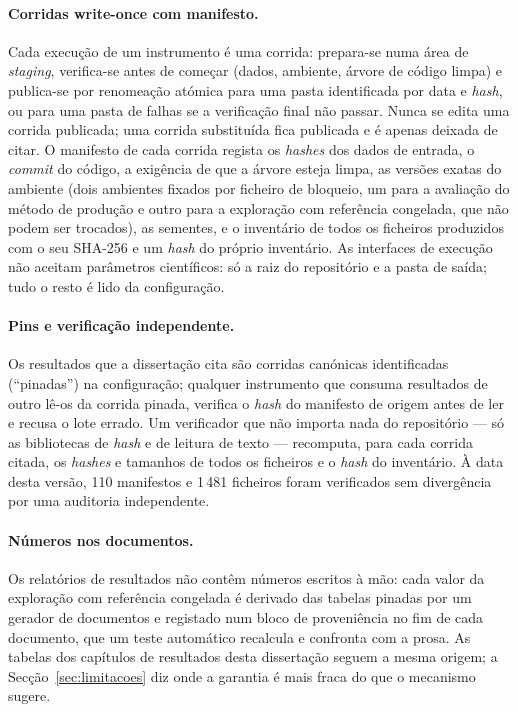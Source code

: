 \paragraph{Corridas write-once com manifesto.} Cada execução de um
instrumento é uma corrida: prepara-se numa área de \emph{staging},
verifica-se antes de começar (dados, ambiente, árvore de código limpa) e
publica-se por renomeação atómica para uma pasta identificada por data e
\emph{hash}, ou para uma pasta de falhas se a verificação final não
passar. Nunca se edita uma corrida publicada; uma corrida substituída
fica publicada e é apenas deixada de citar. O manifesto de cada corrida
regista os \emph{hashes} dos dados de entrada, o \emph{commit} do código, a
exigência de que a árvore esteja limpa, as versões exatas do ambiente
(dois ambientes fixados por ficheiro de bloqueio, um para a avaliação do
método de produção e outro para a exploração com referência congelada, que
não podem ser trocados), as sementes, e o inventário de todos os ficheiros
produzidos com o seu SHA-256 e um \emph{hash} do próprio inventário. As
interfaces de execução não aceitam parâmetros científicos: só a raiz do
repositório e a pasta de saída; tudo o resto é lido da configuração.

\paragraph{Pins e verificação independente.} Os resultados que a
dissertação cita são corridas canónicas identificadas (``pinadas'') na
configuração; qualquer instrumento que consuma resultados de outro lê-os
da corrida pinada, verifica o \emph{hash} do manifesto de origem antes de
ler e recusa o lote errado. Um verificador que não importa nada do
repositório --- só as bibliotecas de \emph{hash} e de leitura de texto ---
recomputa, para cada corrida citada, os \emph{hashes} e tamanhos de todos
os ficheiros e o \emph{hash} do inventário. À data desta versão, 110
manifestos e 1\,481 ficheiros foram verificados sem divergência por uma
auditoria independente.

\paragraph{Números nos documentos.} Os relatórios de resultados não
contêm números escritos à mão: cada valor da exploração com referência
congelada é derivado das tabelas pinadas por um gerador de documentos e
registado num bloco de proveniência no fim de cada documento, que um teste
automático recalcula e confronta com a prosa. As tabelas dos capítulos de
resultados desta dissertação seguem a mesma origem; a Secção~\ref{sec:limitacoes}
diz onde a garantia é mais fraca do que o mecanismo sugere.


